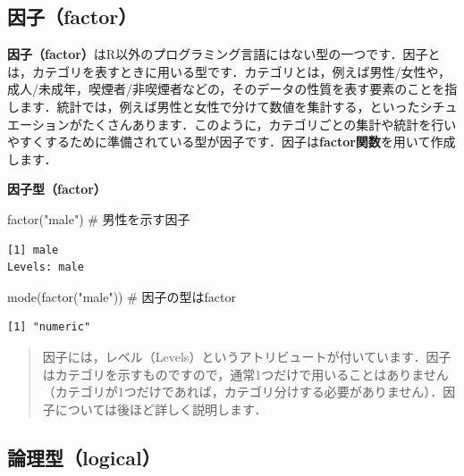 \documentclass[
  letterpaper,
  DIV=11,
  numbers=noendperiod]{scrreprt}
\newenvironment{Shaded}{\begin{snugshade}}{\end{snugshade}}
\newcommand{\CommentTok}[1]{\textcolor[rgb]{0.37,0.37,0.37}{#1}}
\newcommand{\FunctionTok}[1]{\textcolor[rgb]{0.28,0.35,0.67}{#1}}
\newcommand{\NormalTok}[1]{\textcolor[rgb]{0.00,0.23,0.31}{#1}}
\newcommand{\StringTok}[1]{\textcolor[rgb]{0.13,0.47,0.30}{#1}}
\begin{document}
\hypertarget{ux56e0ux5b50factor}{%
\subsection{因子（factor）}\label{ux56e0ux5b50factor}}

\textbf{因子（factor）}はR以外のプログラミング言語にはない型の一つです．因子とは，カテゴリを表すときに用いる型です．カテゴリとは，例えば男性/女性や，成人/未成年，喫煙者/非喫煙者などの，そのデータの性質を表す要素のことを指します．統計では，例えば男性と女性で分けて数値を集計する，といったシチュエーションがたくさんあります．このように，カテゴリごとの集計や統計を行いやすくするために準備されている型が因子です．因子は\textbf{factor関数}を用いて作成します．

\textbf{因子型（factor）}

\begin{Shaded}
\begin{Highlighting}[]
\FunctionTok{factor}\NormalTok{(}\StringTok{"male"}\NormalTok{) }\CommentTok{\# 男性を示す因子}
\end{Highlighting}
\end{Shaded}

\begin{verbatim}
[1] male
Levels: male
\end{verbatim}

\begin{Shaded}
\begin{Highlighting}[]
\FunctionTok{mode}\NormalTok{(}\FunctionTok{factor}\NormalTok{(}\StringTok{"male"}\NormalTok{)) }\CommentTok{\# 因子の型はfactor}
\end{Highlighting}
\end{Shaded}

\begin{verbatim}
[1] "numeric"
\end{verbatim}

\begin{quote}
因子には，レベル（Levels）というアトリビュートが付いています．因子はカテゴリを示すものですので，通常1つだけで用いることはありません（カテゴリが1つだけであれば，カテゴリ分けする必要がありません）．因子については後ほど詳しく説明します．
\end{quote}

\hypertarget{ux8ad6ux7406ux578blogical}{%
\subsection{論理型（logical）}\label{ux8ad6ux7406ux578blogical}}
\end{document}
